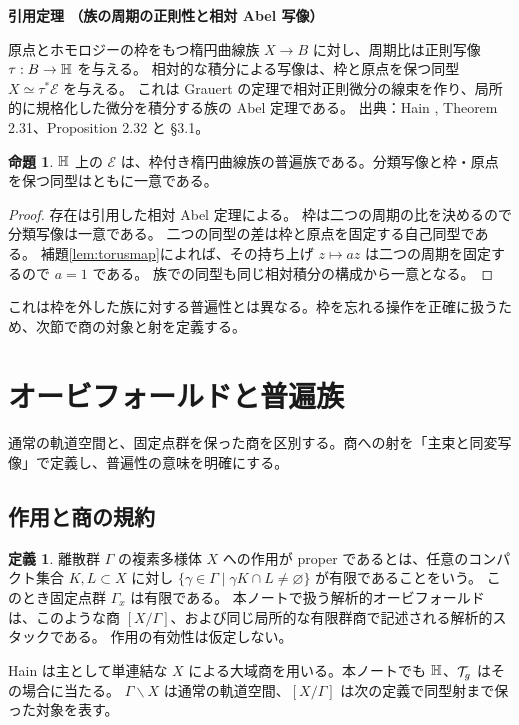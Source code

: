 \documentclass[dvipdfmx,a4paper,11pt]{article}
\theoremstyle{definition}
\newtheorem{prop}[thm]{命題}
\newtheorem{dfn}[thm]{定義}
\newenvironment{aim}{\begin{tcolorbox}[mybox,colback=green!3,title=この章で考えること,fonttitle=\bfseries]}{\end{tcolorbox}}
\newenvironment{external}[1]{\Needspace{7\baselineskip}\refstepcounter{thm}\begin{tcolorbox}[mybox,colback=blue!2,colframe=blue!40!black]\textbf{引用定理 \thethm（#1）}\par}{\end{tcolorbox}}
\begin{document}
\begin{external}{族の周期の正則性と相対 Abel 写像}
原点とホモロジーの枠をもつ楕円曲線族 $X\to B$ に対し、周期比は正則写像 $\tau:B\to\mathbb H$ を与える。
相対的な積分による写像は、枠と原点を保つ同型 $X\simeq\tau^*\mathscr E$ を与える。
これは Grauert の定理で相対正則微分の線束を作り、局所的に規格化した微分を積分する族の Abel 定理である。
出典：Hain \cite{Hain}, Theorem 2.31、Proposition 2.32 と \S3.1。
\end{external}
\begin{prop}
$\mathbb H$ 上の $\mathscr E$ は、枠付き楕円曲線族の普遍族である。分類写像と枠・原点を保つ同型はともに一意である。
\end{prop}
\begin{proof}
存在は引用した相対 Abel 定理による。
枠は二つの周期の比を決めるので分類写像は一意である。
二つの同型の差は枠と原点を固定する自己同型である。
補題\ref{lem:torusmap}によれば、その持ち上げ $z\mapsto az$ は二つの周期を固定するので $a=1$ である。
族での同型も同じ相対積分の構成から一意となる。
\end{proof}
これは枠を外した族に対する普遍性とは異なる。枠を忘れる操作を正確に扱うため、次節で商の対象と射を定義する。

\par\bigskip\Needspace{.70\textheight}
\section{オービフォールドと普遍族}\label{sec:orb}
\begin{aim}
通常の軌道空間と、固定点群を保った商を区別する。商への射を「主束と同変写像」で定義し、普遍性の意味を明確にする。
\end{aim}
\subsection{作用と商の規約}
\begin{dfn}
離散群 $\Gamma$ の複素多様体 $X$ への作用が proper であるとは、任意のコンパクト集合 $K,L\subset X$ に対し
$\{\gamma\in\Gamma\mid\gamma K\cap L\neq\varnothing\}$ が有限であることをいう。
このとき固定点群 $\Gamma_x$ は有限である。
本ノートで扱う解析的オービフォールドは、このような商 $[X/\Gamma]$、および同じ局所的な有限群商で記述される解析的スタックである。
作用の有効性は仮定しない。
\end{dfn}
Hain は主として単連結な $X$ による大域商を用いる。本ノートでも $\mathbb H$、$\mathcal T_g$ はその場合に当たる。
$\Gamma\backslash X$ は通常の軌道空間、$[X/\Gamma]$ は次の定義で同型射まで保った対象を表す。
\end{document}
